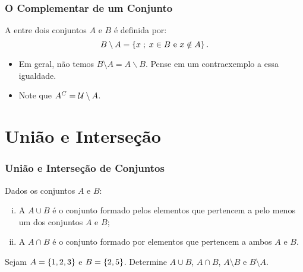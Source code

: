 \documentclass[brazil, notheorems, 10pt]{beamer}
\begin{document}
\begin{frame}
\frametitle{O Complementar de um Conjunto} %

\begin{Def}
A  entre dois conjuntos $A$ e $B$ é definida por:
$$ B \setminus A = \left\{x \;;\; x \in B \text { e } x \notin A\right\}.$$
\end{Def}

\begin{itemize}
  \item Em geral, não temos $B \setminus A = A \backslash B$. Pense em um contraexemplo a essa
  igualdade.
  \item Note que $A^C = \mathcal U \setminus A$.
\end{itemize}

\end{frame}

\section{União e Interseção}
\begin{frame}
\frametitle{União e Interseção de Conjuntos} %

\begin{Def}
Dados os conjuntos $A$ e $B$:
\begin{enumerate}[i.]
  \item A  $A \cup B$ é o conjunto formado pelos
  elementos que pertencem a pelo menos um dos conjuntos $A$ e $B$;
  \item A  $A \cap B$ é o conjunto formado por elementos que pertencem a ambos $A$ e
  $B$.
\end{enumerate}
\end{Def}

\begin{Exem}
Sejam $A = \left\{1, 2, 3\right\}$ e $ B = \left\{2,5\right\}$. Determine $A \cup B$,
$A \cap B$, $A \setminus B$ e $B \setminus A$.
\end{Exem}

\end{frame}

\end{document}
